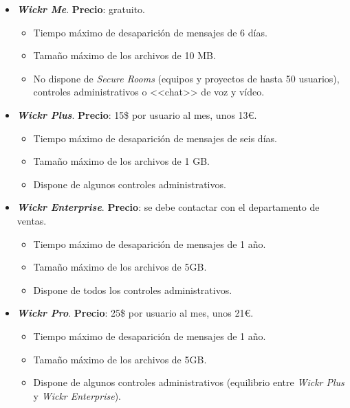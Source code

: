 \begin{itemize}
	\item \textbf{\textit{Wickr Me}}. \textbf{Precio}: gratuito.
	
	\begin{itemize}
		\item Tiempo máximo de desaparición de mensajes de 6 días.
		\item Tamaño máximo de los archivos de 10 \acs{MB}.
		\item No dispone de \textit{Secure Rooms} (equipos y proyectos de hasta 50 usuarios), controles administrativos o <<chat>> de voz y vídeo.		
	\end{itemize}

	\newpage

	\item \textbf{\textit{Wickr Plus}}. \textbf{Precio}: 15\$ por usuario al mes, unos 13\euro{}.
	
	\begin{itemize}
		\item Tiempo máximo de desaparición de mensajes de seis días.
		\item Tamaño máximo de los archivos de 1 \acs{GB}.
		\item Dispone de algunos controles administrativos.
	\end{itemize}

	\item \textbf{\textit{Wickr Enterprise}}. \textbf{Precio}: se debe contactar con el departamento de ventas.

	\begin{itemize}
		\item Tiempo máximo de desaparición de mensajes de 1 año.
		\item Tamaño máximo de los archivos de 5\acs{GB}.
		\item Dispone de todos los controles administrativos.
	\end{itemize}

	\item \textbf{\textit{Wickr Pro}}. \textbf{Precio}: 25\$ por usuario al mes, unos 21\euro{}.

	\begin{itemize}
		\item Tiempo máximo de desaparición de mensajes de 1 año.
		\item Tamaño máximo de los archivos de 5\acs{GB}.
		\item Dispone de algunos controles administrativos (equilibrio entre \textit{Wickr Plus} y \textit{Wickr Enterprise}).
	\end{itemize}

\end{itemize}

